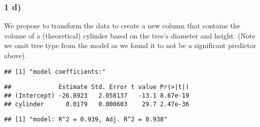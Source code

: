 \documentclass[
  11pt,
]{article}
\newenvironment{Shaded}{\begin{snugshade}}{\end{snugshade}}
\newcommand{\AttributeTok}[1]{\textcolor[rgb]{0.77,0.63,0.00}{#1}}
\newcommand{\CommentTok}[1]{\textcolor[rgb]{0.56,0.35,0.01}{\textit{#1}}}
\newcommand{\FunctionTok}[1]{\textcolor[rgb]{0.00,0.00,0.00}{#1}}
\newcommand{\NormalTok}[1]{#1}
\newcommand{\OtherTok}[1]{\textcolor[rgb]{0.56,0.35,0.01}{#1}}
\newcommand{\SpecialCharTok}[1]{\textcolor[rgb]{0.00,0.00,0.00}{#1}}
\newcommand{\StringTok}[1]{\textcolor[rgb]{0.31,0.60,0.02}{#1}}
\begin{document}
\hypertarget{d}{%
\subsubsection{1 d)}\label{d}}

We propose to transform the data to create a new column that contains
the volume of a (theoretical) cylinder based on the tree's diameter and
height. (Note we omit tree type from the model as we found it to not be
a significant predictor above).

\begin{Shaded}
\end{Shaded}

\begin{verbatim}
## [1] "model coefficients:"
\end{verbatim}

\begin{verbatim}
##             Estimate Std. Error t value Pr(>|t|)
## (Intercept) -26.8923   2.058137   -13.1 8.67e-19
## cylinder      0.0179   0.000603    29.7 2.47e-36
\end{verbatim}

\begin{Shaded}
\end{Shaded}

\begin{verbatim}
## [1] "model: R^2 = 0.939, Adj. R^2 = 0.938"
\end{verbatim}
\end{document}

